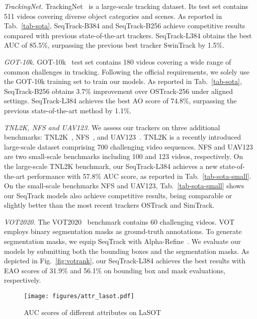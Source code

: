 \textit{TrackingNet.}
TrackingNet~\cite{trackingnet} is a large-scale tracking dataset. Its test set contains 511 videos covering diverse object categories and scenes. As reported in Tab.~\ref{tab-sota}, SeqTrack-B384 and SeqTrack-B256 achieve competitive results compared with previous state-of-the-art trackers. SeqTrack-L384 obtains the best AUC of 85.5\%, surpassing the previous best tracker SwinTrack by 1.5\%.

\textit{GOT-10k.}
GOT-10k~\cite{GOT10K} test set contains 180 videos covering a wide range of common challenges in tracking. Following the official requirements, we solely use the GOT-10k training set to train our models. 
As reported in Tab.~\ref{tab-sota}, SeqTrack-B256 obtains 3.7\% improvement over OSTrack-256 under aligned settings. SeqTrack-L384 achieves the best AO score of 74.8\%, surpassing the previous state-of-the-art method by 1.1\%.

\textit{TNL2K, NFS and UAV123.}
We assess our trackers on three additional benchmarks: TNL2K~\cite{TNL2K}, NFS~\cite{NFS}, and UAV123~\cite{UAV}. TNL2K is a recently introduced large-scale dataset comprising 700 challenging video sequences. NFS and UAV123 are two small-scale benchmarks including 100 and 123 videos, respectively. On the large-scale TNL2K benchmark, our SeqTrack-L384 achieves a new state-of-the-art performance with 57.8\% AUC score, as reported in Tab.~\ref{tab-sota-small}. On the small-scale benchmarks NFS and UAV123, Tab.~\ref{tab-sota-small} shows our SeqTrack models also achieve competitive results, being comparable or slightly better than the most recent trackers OSTrack and SimTrack.

\textit{VOT2020.}
The VOT2020~\cite{vot2020} benchmark contains 60 challenging videos. VOT employs binary segmentation masks as ground-truth annotations. To generate segmentation masks, we equip SeqTrack with Alpha-Refine~\cite{Alpha-Refine}.
We evaluate our models by submitting both the bounding boxes and the segmentation masks.
As depicted in Fig.~\ref{fig:votrank}, our SeqTrack-L384 achieves the best results with EAO scores of 31.9\% and 56.1\% on bounding box and mask evaluations, respectively.

\begin{figure}[t!]
\centering
    \texttt{[image: figures/attr\_lasot.pdf]}
    \vspace{-7mm}
    \caption{AUC scores of different attributes on LaSOT \cite{LaSOT}}
    \label{fig:lasotattr}
      \vspace{-1mm}
\end{figure}

